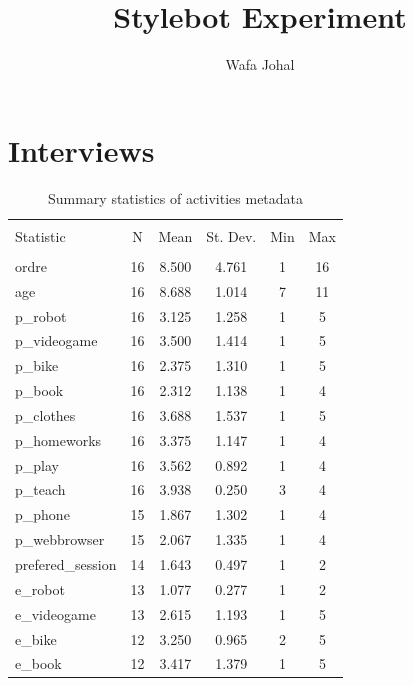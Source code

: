 \documentclass{article}
\title{Stylebot Experiment}
\author{Wafa Johal}
\begin{document}

\maketitle




\section{Interviews}
\begin{table}[!htbp] \centering 
  \caption{Summary statistics of activities metadata} 
  \label{} 
\begin{tabular}{@{\extracolsep{5pt}}lccccc} 
\\[-1.8ex]\hline 
\hline \\[-1.8ex] 
Statistic & \multicolumn{1}{c}{N} & \multicolumn{1}{c}{Mean} & \multicolumn{1}{c}{St. Dev.} & \multicolumn{1}{c}{Min} & \multicolumn{1}{c}{Max} \\ 
\hline \\[-1.8ex] 
ordre & 16 & 8.500 & 4.761 & 1 & 16 \\ 
age & 16 & 8.688 & 1.014 & 7 & 11 \\ 
p\_robot & 16 & 3.125 & 1.258 & 1 & 5 \\ 
p\_videogame & 16 & 3.500 & 1.414 & 1 & 5 \\ 
p\_bike & 16 & 2.375 & 1.310 & 1 & 5 \\ 
p\_book & 16 & 2.312 & 1.138 & 1 & 4 \\ 
p\_clothes & 16 & 3.688 & 1.537 & 1 & 5 \\ 
p\_homeworks & 16 & 3.375 & 1.147 & 1 & 4 \\ 
p\_play & 16 & 3.562 & 0.892 & 1 & 4 \\ 
p\_teach & 16 & 3.938 & 0.250 & 3 & 4 \\ 
p\_phone & 15 & 1.867 & 1.302 & 1 & 4 \\ 
p\_webbrowser & 15 & 2.067 & 1.335 & 1 & 4 \\ 
prefered\_session & 14 & 1.643 & 0.497 & 1 & 2 \\ 
e\_robot & 13 & 1.077 & 0.277 & 1 & 2 \\ 
e\_videogame & 13 & 2.615 & 1.193 & 1 & 5 \\ 
e\_bike & 12 & 3.250 & 0.965 & 2 & 5 \\ 
e\_book & 12 & 3.417 & 1.379 & 1 & 5 \\ 

\end{tabular}
\end{table}
\end{document}
